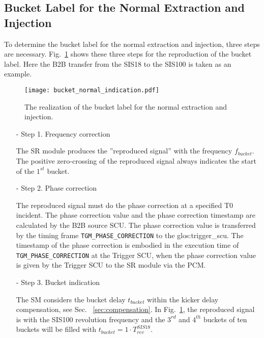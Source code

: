 \subsection{Bucket Label for the Normal Extraction and Injection}

To determine the bucket label for the normal extraction and injection, three steps are necessary. Fig.~\ref{bucket_label} shows these three steps for the reproduction of the bucket label. Here the B2B transfer from the SIS18 to the SIS100 is taken as an example.
\begin{figure}[!htb]
   \centering   
   \texttt{[image: bucket\_normal\_indication.pdf]}
   \caption{The realization of the bucket label for the normal extraction and injection.}
   \label{bucket_label}
\end{figure}  
\begin{itemize}
\item[-] Step 1. Frequency correction

The \gls{SR} module produces the ''reproduced signal'' with the frequency $f_{\mathit{bucket}}$. The positive zero-crossing of the reproduced signal always indicates the start of the $1^{st}$ bucket.
\item[-] Step 2. Phase correction

The reproduced signal must do the phase correction at a specified T0 incident. The phase correction value and the phase correction timestamp are calculated by the B2B source SCU. The phase correction value is transferred by the timing frame \verb|TGM_PHASE_CORRECTION| to the \gls{glos:trigger_scu}. The timestamp of the phase correction is embodied in the execution time of \verb|TGM_PHASE_CORRECTION| at the Trigger SCU, when the phase correction value is given by the Trigger SCU to the SR module via the PCM.


\item[-] Step 3. Bucket indication

The SM considers the bucket delay $t_{\mathit{bucket}}$ within the kicker delay compensation, see Sec. ~\ref{sec:compensation}. In Fig.~\ref{bucket_label}, the reproduced signal is with the SIS100 revolution frequency and the $3^{rd}$ and $4^{th}$ buckets of ten buckets will be filled with $t_{\mathit{bucket}}=1\cdot T_{\mathit{rev}}^{\mathit{SIS18}}$. 
\end{itemize}

